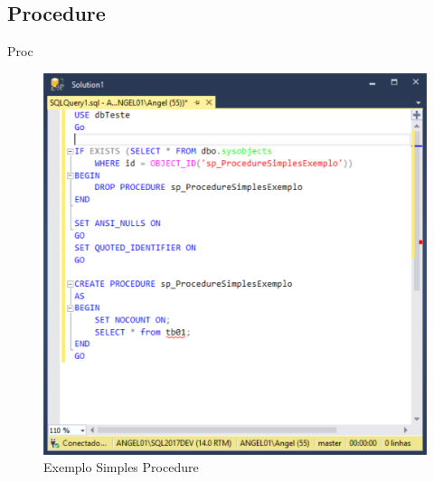 	
	\subsection{Procedure}

	\begin{frame}
	
	\begin{CaixaModelo01}{Proc}

	

	\begin{figure}
		\includegraphics[scale=.35]{./Figuras/Procedure01.png}
		\caption{Exemplo Simples Procedure}
		\label{fig:Procedure01}
	\end{figure}
	



	\end{CaixaModelo01}
	
	\end{frame}
